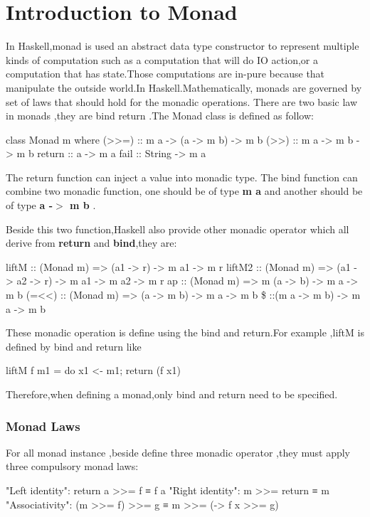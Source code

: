 \section{Introduction to Monad}
In Haskell,monad is used an abstract data type constructor to represent multiple kinds of computation such as a computation that will do IO action,or a computation that has state.Those computations are in-pure because that manipulate the outside world.In Haskell.Mathematically, monads are governed by set of laws that should hold for the monadic operations.\cite{intro} There are two basic law in monads ,they are bind return .The Monad class is defined as follow:
\begin{hcode}
class Monad m where
  (>>=) :: m a -> (a -> m b) -> m b
  (>>) :: m a -> m b -> m b
  return :: a -> m a
  fail :: String -> m a
\end{hcode}

The return function can inject a value into monadic type.
The bind function can combine two monadic function, one should be of type \textbf{m a} and another should be of type \textbf{a -$>$ m b} .

Beside this two function,Haskell also provide other monadic operator which all derive from \textbf{return} and \textbf{bind},they are:
\begin{hexample}
liftM :: (Monad m) => (a1 -> r) -> m a1 -> m r
liftM2  :: (Monad m) => (a1 -> a2 -> r) -> m a1 -> m a2 -> m r
ap :: (Monad m) => m (a -> b) -> m a -> m b
(=<<) :: (Monad m) => (a -> m b) -> m a -> m b
\$ ::(m a -> m b) -> m a -> m b 
\end{hexample}

These monadic operation is define using the bind and return.For example ,liftM is defined by bind and return like 
\begin{hcode}
liftM f m1              = do { x1 <- m1; return (f x1) }
\end{hcode}
Therefore,when defining a monad,only bind and return need to be specified.

\subsubsection{Monad Laws}
For all monad instance ,beside define three monadic operator ,they must apply three compulsory monad laws:
\begin{hcode}
"Left identity": return a >>= f  ≡  f a
"Right identity": m >>= return  ≡  m
"Associativity": (m >>= f) >>= g  ≡  m >>= (\x -> f x >>= g)
\end{hcode}

